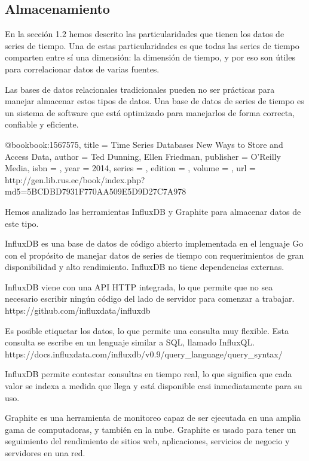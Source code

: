 \subsection{Almacenamiento}
\label{almacenamiento}

En la sección 1.2 hemos descrito las particularidades que tienen los datos de series de tiempo. Una de estas particularidades es que todas las series de tiempo comparten entre sí una dimensión: la dimensión de tiempo, y por eso son útiles para correlacionar datos de varias fuentes.

Las bases de datos relacionales tradicionales pueden no ser prácticas para manejar almacenar estos tipos de datos. Una base de datos de series de tiempo es un sistema de software que está optimizado para manejarlos de forma correcta, confiable y eficiente.

@book{book:1567575,
   title =     {Time Series Databases  New Ways to Store and Access Data},
   author =    {Ted Dunning, Ellen Friedman},
   publisher = {O'Reilly Media},
   isbn =      {},
   year =      {2014},
   series =    {},
   edition =   {},
   volume =    {},
   url =       {http://gen.lib.rus.ec/book/index.php?md5=5BCDBD7931F770AA509E5D9D27C7A978}}


Hemos analizado las herramientas InfluxDB y Graphite para almacenar datos de este tipo. 

InfluxDB es una base de datos de código abierto implementada en el lenguaje Go con el propósito de manejar datos de series de tiempo con requerimientos de gran disponibilidad y alto rendimiento. InfluxDB no tiene dependencias externas.

InfluxDB viene con una API HTTP integrada, lo que permite que no sea necesario escribir ningún código del lado de servidor para comenzar a trabajar.
https://github.com/influxdata/influxdb

Es posible etiquetar los datos, lo que permite una consulta muy flexible. Esta consulta se escribe en un lenguaje similar a SQL, llamado InfluxQL.  https://docs.influxdata.com/influxdb/v0.9/query_language/query_syntax/

InfluxDB permite contestar consultas en tiempo real, lo que significa que cada valor se indexa a medida que llega y está disponible casi inmediatamente para su uso.

Graphite es una herramienta de monitoreo capaz de ser ejecutada en una amplia gama de computadoras, y también en la nube. Graphite es usado para tener un seguimiento del rendimiento de sitios web, aplicaciones, servicios de negocio y servidores en una red.

